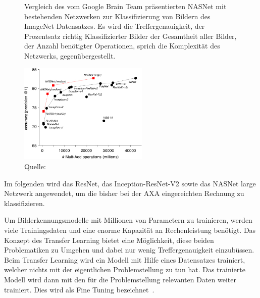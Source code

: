 \begin{figure} 
    \caption{Vergleich des vom Google Brain Team präsentierten NASNet mit bestehenden Netzwerken zur Klassifizierung von Bildern des ImageNet Datensatzes. Es wird die Treffergenauigkeit, der Prozentsatz richtig Klassifizierter Bilder der Gesamtheit aller Bilder, der Anzahl benötigter Operationen, sprich die Komplexität des Netzwerks, gegenübergestellt.}
    \label{nasnet-comparision}
    \centering
    \includegraphics[width=0.55\textwidth]{graphics/nasnet-comparision.jpg}
    \caption*{Quelle: \textcite{GoogleNasNet}}
\end{figure}







Im folgenden wird das ResNet, das Inception-ResNet-V2 sowie das NASNet large Netzwerk angewendet, um die bisher bei der AXA eingereichten Rechnung zu klassifizieren.

Um Bilderkennungsmodelle mit Millionen von Parametern zu trainieren, werden viele Trainingsdaten und eine enorme Kapazität an Rechenleistung benötigt. Das Konzept des Transfer Learning bietet eine Möglichkeit, diese beiden Problematiken zu Umgehen und dabei nur wenig Treffergenauigkeit einzubüssen. Beim Transfer Learning wird ein Modell mit Hilfe eines Datensatzes trainiert, welcher nichts mit der eigentlichen Problemstellung zu tun hat. Das trainierte Modell wird dann mit den für die Problemstellung relevanten Daten weiter trainiert. Dies wird als Fine Tuning bezeichnet~\autocite{TensorflowImageRetraining, TDSTransferLearning}.

